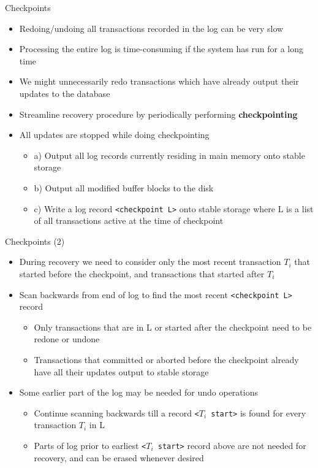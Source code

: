 \documentclass[aspectratio=169, xcolor=dvipsnames]{beamer}
\begin{document}
\begin{frame}{Checkpoints}
    \begin{itemize}[<+->]
        \item Redoing/undoing all transactions recorded in the log can be very slow
        \item Processing the entire log is time-consuming if the system has run for a long time
        \item We might unnecessarily redo transactions which have already output their updates to the database
        \item Streamline recovery procedure by periodically performing \textbf{checkpointing}
        \item All updates are stopped while doing checkpointing
        \begin{itemize}
            \item[$\triangleright$] a) Output all log records currently residing in main memory onto stable storage
            \item[$\triangleright$] b) Output all modified buffer blocks to the disk
            \item[$\triangleright$] c) Write a log record \texttt{<checkpoint L>} onto stable storage where L is a list of all transactions active at the time of checkpoint
        \end{itemize}
    \end{itemize}
\end{frame}

\begin{frame}{Checkpoints (2)}
    \begin{itemize}[<+->]
        \item During recovery we need to consider only the most recent transaction $T_i$ that started before the checkpoint, and transactions that started after $T_i$
        \item Scan backwards from end of log to find the most recent \texttt{<checkpoint L>} record
        \begin{itemize}
            \item[$\triangleright$] Only transactions that are in L or started after the checkpoint need to be redone or undone
            \item[$\triangleright$] Transactions that committed or aborted before the checkpoint already have all their updates output to stable storage
        \end{itemize}
        \item Some earlier part of the log may be needed for undo operations
        \begin{itemize}
            \item[$\triangleright$] Continue scanning backwards till a record \texttt{<$T_i$ start>} is found for every transaction $T_i$ in L
            \item[$\triangleright$] Parts of log prior to earliest \texttt{<$T_i$ start>} record above are not needed for recovery, and can be erased whenever desired
        \end{itemize}
    \end{itemize}
\end{frame}
\end{document}
